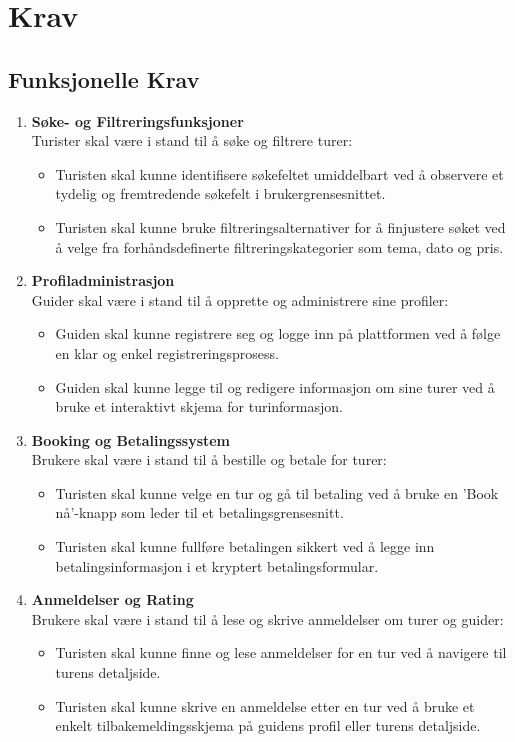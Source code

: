 \documentclass[../doc.tex]{subfiles}
\begin{document}
\section{Krav}
\subsection{Funksjonelle Krav}
\begin{enumerate}
    \item \textbf{Søke- og Filtreringsfunksjoner} \\
    Turister skal være i stand til å søke og filtrere turer:
    \begin{itemize}
        \item Turisten skal kunne identifisere søkefeltet umiddelbart ved å observere et tydelig og fremtredende søkefelt i brukergrensesnittet.
        \item Turisten skal kunne bruke filtreringsalternativer for å finjustere søket ved å velge fra forhåndsdefinerte filtreringskategorier som tema, dato og pris.
    \end{itemize}

    \item \textbf{Profiladministrasjon} \\
    Guider skal være i stand til å opprette og administrere sine profiler:
    \begin{itemize}
        \item Guiden skal kunne registrere seg og logge inn på plattformen ved å følge en klar og enkel registreringsprosess.
        \item Guiden skal kunne legge til og redigere informasjon om sine turer ved å bruke et interaktivt skjema for turinformasjon.
    \end{itemize}
    \item \textbf{Booking og Betalingssystem} \\
    Brukere skal være i stand til å bestille og betale for turer:
    \begin{itemize}
        \item Turisten skal kunne velge en tur og gå til betaling ved å bruke en 'Book nå'-knapp som leder til et betalingsgrensesnitt.
        \item Turisten skal kunne fullføre betalingen sikkert ved å legge inn betalingsinformasjon i et kryptert betalingsformular.
    \end{itemize}


    \item \textbf{Anmeldelser og Rating} \\ 
    Brukere skal være i stand til å lese og skrive anmeldelser om turer og guider:
    \begin{itemize}
        \item Turisten skal kunne finne og lese anmeldelser for en tur ved å navigere til turens detaljside.
        \item Turisten skal kunne skrive en anmeldelse etter en tur ved å bruke et enkelt tilbakemeldingsskjema på guidens profil eller turens detaljside.
    \end{itemize}


\end{enumerate}
\end{document}
